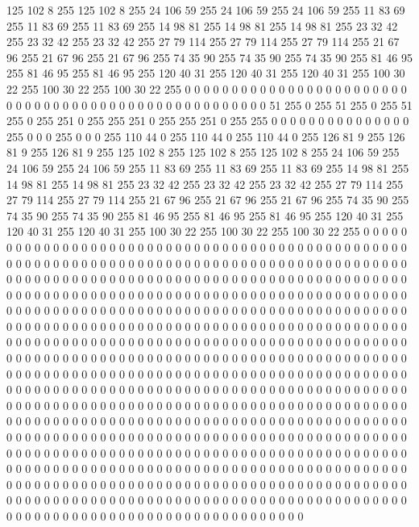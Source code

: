 125 102 8 255 125 102 8 255 24 106 59 255 24 106 59 255 24 106 59 255 11 83 69 255 11 83 69 255 11 83 69 255 14 98 81 255 14 98 81 255 14 98 81 255 23 32 42 255 23 32 42 255 23 32 42 255 27 79 114 255 27 79 114 255
27 79 114 255 21 67 96 255 21 67 96 255 21 67 96 255 74 35 90 255 74 35 90 255 74 35 90 255 81 46 95 255 81 46 95 255 81 46 95 255 120 40 31 255 120 40 31 255 120 40 31 255 100 30 22 255 100 30 22 255 100 30 22 255
0 0 0 0 0 0 0 0 0 0 0 0 0 0 0 0 0 0 0 0 0 0 0 0 0 0 0 0 0 0 0 0 0 0 0 0 0 0 0 0 0 0 0 0 0 0 0 0 0 0 0 0 51 255 0 255 51 255 0 255 51 255 0 255
251 0 255 255 251 0 255 255 251 0 255 255 0 0 0 0 0 0 0 0 0 0 0 0 0 0 0 255 0 0 0 255 0 0 0 255 110 44 0 255 110 44 0 255 110 44 0 255 126 81 9 255 126 81 9 255 126 81 9 255 125 102 8 255
125 102 8 255 125 102 8 255 24 106 59 255 24 106 59 255 24 106 59 255 11 83 69 255 11 83 69 255 11 83 69 255 14 98 81 255 14 98 81 255 14 98 81 255 23 32 42 255 23 32 42 255 23 32 42 255 27 79 114 255 27 79 114 255
27 79 114 255 21 67 96 255 21 67 96 255 21 67 96 255 74 35 90 255 74 35 90 255 74 35 90 255 81 46 95 255 81 46 95 255 81 46 95 255 120 40 31 255 120 40 31 255 120 40 31 255 100 30 22 255 100 30 22 255 100 30 22 255
0 0 0 0 0 0 0 0 0 0 0 0 0 0 0 0 0 0 0 0 0 0 0 0 0 0 0 0 0 0 0 0 0 0 0 0 0 0 0 0 0 0 0 0 0 0 0 0 0 0 0 0 0 0 0 0 0 0 0 0 0 0 0 0
0 0 0 0 0 0 0 0 0 0 0 0 0 0 0 0 0 0 0 0 0 0 0 0 0 0 0 0 0 0 0 0 0 0 0 0 0 0 0 0 0 0 0 0 0 0 0 0 0 0 0 0 0 0 0 0 0 0 0 0 0 0 0 0
0 0 0 0 0 0 0 0 0 0 0 0 0 0 0 0 0 0 0 0 0 0 0 0 0 0 0 0 0 0 0 0 0 0 0 0 0 0 0 0 0 0 0 0 0 0 0 0 0 0 0 0 0 0 0 0 0 0 0 0 0 0 0 0
0 0 0 0 0 0 0 0 0 0 0 0 0 0 0 0 0 0 0 0 0 0 0 0 0 0 0 0 0 0 0 0 0 0 0 0 0 0 0 0 0 0 0 0 0 0 0 0 0 0 0 0 0 0 0 0 0 0 0 0 0 0 0 0
0 0 0 0 0 0 0 0 0 0 0 0 0 0 0 0 0 0 0 0 0 0 0 0 0 0 0 0 0 0 0 0 0 0 0 0 0 0 0 0 0 0 0 0 0 0 0 0 0 0 0 0 0 0 0 0 0 0 0 0 0 0 0 0
0 0 0 0 0 0 0 0 0 0 0 0 0 0 0 0 0 0 0 0 0 0 0 0 0 0 0 0 0 0 0 0 0 0 0 0 0 0 0 0 0 0 0 0 0 0 0 0 0 0 0 0 0 0 0 0 0 0 0 0 0 0 0 0
0 0 0 0 0 0 0 0 0 0 0 0 0 0 0 0 0 0 0 0 0 0 0 0 0 0 0 0 0 0 0 0 0 0 0 0 0 0 0 0 0 0 0 0 0 0 0 0 0 0 0 0 0 0 0 0 0 0 0 0 0 0 0 0
0 0 0 0 0 0 0 0 0 0 0 0 0 0 0 0 0 0 0 0 0 0 0 0 0 0 0 0 0 0 0 0 0 0 0 0 0 0 0 0 0 0 0 0 0 0 0 0 0 0 0 0 0 0 0 0 0 0 0 0 0 0 0 0
0 0 0 0 0 0 0 0 0 0 0 0 0 0 0 0 0 0 0 0 0 0 0 0 0 0 0 0 0 0 0 0 0 0 0 0 0 0 0 0 0 0 0 0 0 0 0 0 0 0 0 0 0 0 0 0 0 0 0 0 0 0 0 0
0 0 0 0 0 0 0 0 0 0 0 0 0 0 0 0 0 0 0 0 0 0 0 0 0 0 0 0 0 0 0 0 0 0 0 0 0 0 0 0 0 0 0 0 0 0 0 0 0 0 0 0 0 0 0 0 0 0 0 0 0 0 0 0
0 0 0 0 0 0 0 0 0 0 0 0 0 0 0 0 0 0 0 0 0 0 0 0 0 0 0 0 0 0 0 0 0 0 0 0 0 0 0 0 0 0 0 0 0 0 0 0 0 0 0 0 0 0 0 0 0 0 0 0 0 0 0 0
0 0 0 0 0 0 0 0 0 0 0 0 0 0 0 0 0 0 0 0 0 0 0 0 0 0 0 0 0 0 0 0 0 0 0 0 0 0 0 0 0 0 0 0 0 0 0 0 0 0 0 0 0 0 0 0 0 0 0 0 0 0 0 0
